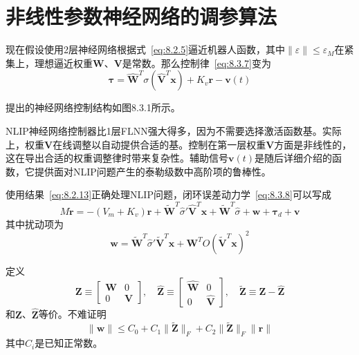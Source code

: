 \documentclass[12pt,a4paper]{ctexart}
\begin{document}
\section{非线性参数神经网络的调参算法}

现在假设使用2层神经网络根据式~\eqref{eq:8.2.5}逼近机器人函数，其中$\|\varepsilon\| \leq \varepsilon_M$在紧集上，理想逼近权重$\bm{W}$、$\bm{V}$是常数。那么控制律~\eqref{eq:8.3.7}变为
\begin{equation}\label{eq:8.5.1}
\bm{\tau} = \hat{\bm{W}}^T \sigma(\hat{\bm{V}}^T \bm{x}) + K_v\bm{r} - \bm{v}(t)
\end{equation}

提出的神经网络控制结构如图8.3.1所示。

NLIP神经网络控制器比1层FLNN强大得多，因为不需要选择激活函数基。实际上，权重$\bm{V}$在线调整以自动提供合适的基。控制在第一层权重$\bm{V}$方面是非线性的，这在导出合适的权重调整律时带来复杂性。辅助信号$\bm{v}(t)$是随后详细介绍的函数，它提供面对NLIP问题产生的泰勒级数中高阶项的鲁棒性。

使用结果~\eqref{eq:8.2.13}正确处理NLIP问题，闭环误差动力学~\eqref{eq:8.3.8}可以写成
\begin{equation}\label{eq:8.5.2}
M\dot{\bm{r}} = -(V_m + K_v)\bm{r} + \tilde{\bm{W}}^T\hat{\sigma}'\hat{\bm{V}}^T\bm{x} + \tilde{\bm{W}}^T\hat{\sigma} + \bm{w} + \bm{\tau}_d + \bm{v}
\end{equation}
其中扰动项为
\begin{equation}\label{eq:8.5.3}
\bm{w} = \tilde{\bm{W}}^T\hat{\sigma}'\tilde{\bm{V}}^T\bm{x} + \bm{W}^T O(\tilde{\bm{V}}^T\bm{x})^2
\end{equation}

定义
\begin{equation}\label{eq:8.5.4}
\bm{Z} \equiv \begin{bmatrix} \bm{W} & 0 \\ 0 & \bm{V} \end{bmatrix}, \quad \hat{\bm{Z}} \equiv \begin{bmatrix} \hat{\bm{W}} & 0 \\ 0 & \hat{\bm{V}} \end{bmatrix}, \quad \tilde{\bm{Z}} \equiv \bm{Z} - \hat{\bm{Z}}
\end{equation}
和$\bm{Z}$、$\hat{\bm{Z}}$等价。不难证明
\begin{equation}\label{eq:8.5.5}
\|\bm{w}\| \leq C_0 + C_1\|\tilde{\bm{Z}}\|_F + C_2\|\tilde{\bm{Z}}\|_F\|\bm{r}\|
\end{equation}
其中$C_i$是已知正常数。
\end{document}
